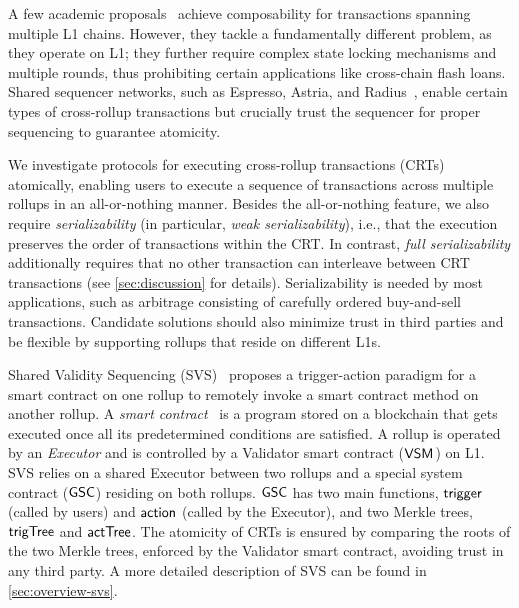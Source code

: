 A few academic proposals~\cite{lu-atomic-cc-interactions-24, fal-tccsci-23, zakhary-ac3-20} achieve composability for transactions spanning multiple L1 chains. However, they tackle a fundamentally different problem, as they operate on L1; they further require complex state locking mechanisms and multiple rounds, thus prohibiting certain applications like cross-chain flash loans. 
Shared sequencer networks, such as Espresso, Astria, and Radius~\cite{espresso-docs, astria-docs, radius-docs}, enable certain types of cross-rollup transactions but crucially trust the sequencer for proper sequencing to guarantee atomicity. 



We investigate protocols for executing cross-rollup transactions (CRTs) atomically, enabling users to execute a sequence of transactions across multiple rollups in an all-or-nothing manner. 
Besides the all-or-nothing feature, we also require \emph{serializability} (in particular, \emph{weak serializability}), i.e., that the execution preserves the order of transactions within the CRT. In contrast, \emph{full serializability} additionally requires that no other transaction can interleave between CRT transactions (see \cref{sec:discussion} for details). \done Serializability is needed by most applications, such as arbitrage consisting of carefully ordered buy-and-sell transactions. 
Candidate solutions should also minimize trust in third parties and be flexible by supporting rollups that reside on different L1s.






Shared Validity Sequencing (SVS)~\cite{shared-val-seq-23} proposes a trigger-action paradigm for a smart contract on one rollup to remotely invoke a smart contract method on another rollup. A \textit{smart contract}~\cite{eth-org-smart-contracts} is a program stored on a blockchain that gets executed once all its predetermined conditions are satisfied. A rollup is operated by an \emph{Executor} and is controlled by a Validator smart contract ($\mathsf{VSM}_{}$) on L1. SVS relies on a shared Executor between two rollups and a special system contract ($\mathsf{GSC}$) residing on both rollups. $\mathsf{GSC}$ has two main functions,
$\mathsf{trigger}$ (called by users) and $\mathsf{action}$ (called by the Executor), and two Merkle trees, $\mathsf{trigTree}$ and $\mathsf{actTree}$. 
The atomicity of CRTs is ensured by comparing the roots of the two Merkle trees, enforced by the Validator smart contract, avoiding trust in any third party. A more detailed description of SVS can be found in \cref{sec:overview-svs}.


